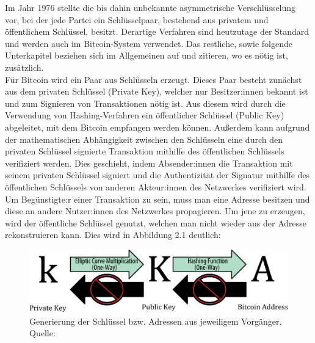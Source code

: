 Im Jahr 1976 stellte \cite{diffie_hellman_1976} die bis dahin unbekannte asymmetrische Verschlüsselung vor, bei der jede Partei ein Schlüsselpaar, bestehend aus privatem und öffentlichem Schlüssel, besitzt. 
Derartige Verfahren sind heutzutage der Standard und werden auch im Bitcoin-System verwendet. Das restliche, sowie folgende Unterkapitel beziehen sich im Allgemeinen auf \cite{antanopoulos_2014} und zitieren, wo es nötig ist, zusätzlich.\\

Für Bitcoin wird ein Paar aus Schlüsseln erzeugt. 
Dieses Paar besteht zunächst aus dem privaten Schlüssel (Private Key), welcher nur Besitzer:innen bekannt ist und zum Signieren von Transaktionen nötig ist.
Aus diesem wird durch die Verwendung von Hashing-Verfahren ein öffentlicher Schlüssel (Public Key) abgeleitet, mit dem Bitcoin empfangen werden können.
Außerdem kann aufgrund der mathematischen Abhängigkeit zwischen den Schlüsseln eine durch den privaten Schlüssel signierte Transaktion mithilfe des öffentlichen Schlüssels verifiziert werden. Dies geschieht, indem Absender:innen die Transaktion mit seinem privaten Schlüssel signiert und die Authentizität der Signatur mithilfe des öffentlichen Schlüssels von anderen Akteur:innen des Netzwerkes verifiziert wird. Um Begünstigte:r einer Transaktion zu sein, muss man eine Adresse besitzen und diese an andere Nutzer:innen des Netzwerkes propagieren. Um jene zu erzeugen, wird der öffentliche Schlüssel genutzt, welchen man nicht wieder aus der Adresse rekonstruieren kann. Dies wird in Abbildung 2.1 deutlich:
\begin{figure}[htpb]
	\centering
	\includegraphics[width=\textwidth]{images/public_and_private_key.png}
	\caption{Generierung der Schlüssel bzw. Adressen aus jeweiligem Vorgänger.\\
	Quelle: \cite[S. 57]{antanopoulos_2014}}
	\label{6braun:fig:keys}
\end{figure}
